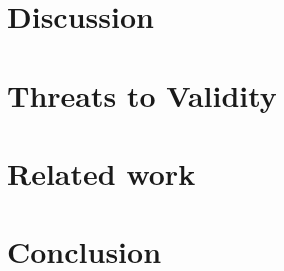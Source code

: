 \documentclass[10pt,journal,compsoc]{IEEEtran}
\begin{document}
\label{rq3}




\section{Discussion}
\label{sec:dis}


\section{Threats to Validity}
\label{sec:threats}

%

\section{Related work}
\label{relatedwork}


\section{Conclusion}
\label{conclusion}




\balance

{
\footnotesize

}
\end{document}
